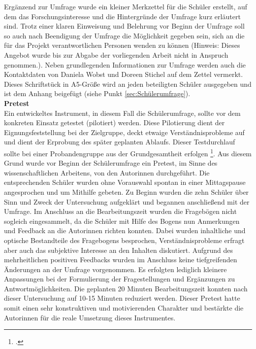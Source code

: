\noindent
Ergänzend zur Umfrage wurde ein kleiner Merkzettel für die Schüler erstellt, auf dem das Forschungsinteresse und die Hintergründe der Umfrage kurz erläutert sind. Trotz einer klaren Einweisung und Belehrung vor Beginn der Umfrage soll so auch nach Beendigung der Umfrage die Möglichkeit gegeben sein, sich an die für das Projekt verantwortlichen Personen wenden zu können (Hinweis: Dieses Angebot wurde bis zur Abgabe der vorliegenden Arbeit nicht in Anspruch genommen.). Neben grundlegenden Informationen zur Umfrage werden auch die Kontaktdaten von Daniela Wobst und Doreen Stichel auf dem Zettel vermerkt. Dieses Schriftstück in A5-Größe wird an jeden beteiligten Schüler ausgegeben und ist dem Anhang beigefügt (siehe Punkt \ref{sec:Schülerumfrage}).\\

\noindent
\textbf{Pretest}\\

\noindent
Ein entwickeltes Instrument, in diesem Fall die Schülerumfrage, sollte vor dem konkreten Einsatz getestet (pilotiert) werden. Diese Pilotierung dient der Eignungsfeststellung bei der Zielgruppe, deckt etwaige Verständnisprobleme auf und dient der Erprobung des später geplanten Ablaufs. Dieser Testdurchlauf sollte bei einer Probandengruppe aus der Grundgesamtheit erfolgen \footcite[vgl.][275]{Krueger2014}. Aus diesem Grund wurde vor Beginn der Schülerumfrage ein Pretest, im Sinne des wissenschaftlichen Arbeitens, von den Autorinnen durchgeführt. Die entsprechenden Schüler wurden ohne Vorauswahl spontan in einer Mittagspause angesprochen und um Mithilfe gebeten. Zu Beginn wurden die zehn Schüler über Sinn und Zweck der Untersuchung aufgeklärt und begannen anschließend mit der Umfrage. Im Anschluss an die Bearbeitungszeit wurden die Fragebögen nicht sogleich eingesammelt, da die Schüler mit Hilfe des Bogens nun Anmerkungen und Feedback an die Autorinnen richten konnten. Dabei wurden inhaltliche und optische Bestandteile des Fragebogens besprochen, Verständnisprobleme erfragt aber auch das subjektive Interesse an den Inhalten diskutiert. Aufgrund des mehrheitlichen positiven Feedbacks wurden im Anschluss keine tiefgreifenden Änderungen an der Umfrage vorgenommen. Es erfolgten lediglich kleinere Anpassungen bei der Formulierung der Fragestellungen und Ergänzungen zu Antwortmöglichkeiten. Die geplanten 20 Minuten Bearbeitungszeit konnten nach dieser Untersuchung auf 10-15 Minuten reduziert werden. Dieser Pretest hatte somit einen sehr konstruktiven und motivierenden Charakter und bestärkte die Autorinnen für die reale Umsetzung dieses Instrumentes.

